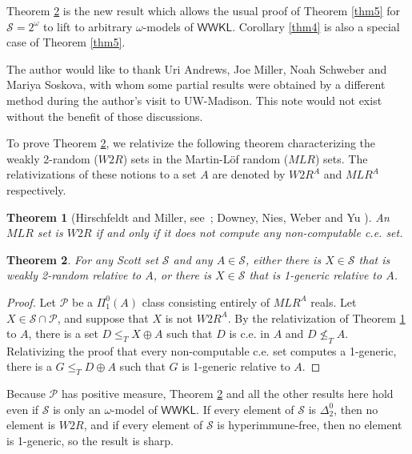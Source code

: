 \documentclass{amsart}
\newtheorem{thm}{Theorem}
\newcommand{\cS}{\mathcal S}
\newcommand{\WWKL}{\mathsf{WWKL}}
\begin{document}
Theorem \ref{thm3} is the new result which allows the usual proof 
of Theorem \ref{thm5} for $\cS = 2^\omega$ to lift to arbitrary 
$\omega$-models of $\WWKL$.
Corollary \ref{thm4} is also a
special case of Theorem \ref{thm5}.  


The author would like to thank Uri Andrews, Joe Miller, Noah Schweber
and Mariya Soskova, with whom some partial results
were obtained by a different method
during the author's visit to
UW-Madison.  This note would not exist without the benefit 
of those discussions.

To prove Theorem \ref{thm3}, we
relativize the following theorem characterizing the 
weakly 2-random ($W2R$) sets in the Martin-L\"of random ($MLR$) sets. 
The relativizations of these notions to a set $A$ are denoted by
$W2R^A$ and $MLR^A$ respectively.

\begin{thm}[Hirschfeldt and Miller, \mbox{see \cite[Thm 5.3.16]{niesbook}}; Downey, Nies, Weber and Yu \cite{dnwy}]\label{hm}
  An $MLR$ set is $W2R$ if and only if it does not compute any
  non-computable c.e. set.
\end{thm}

\begin{thm}\label{thm3}
  For any Scott set $\cS$ and any $A \in \cS$, either there is $X \in \cS$
  that is weakly 2-random relative to $A$, or there is $X \in \cS$ that
  is 1-generic relative to $A$.
\end{thm}
\begin{proof}
  Let $\mathcal P$ be a $\Pi^0_1(A)$ class consisting entirely of $MLR^A$ reals.
  Let $X \in \cS \cap \mathcal P$, and suppose that $X$ is not $W2R^A$.  By the
  relativization of Theorem \ref{hm} to $A$, there is a set $D\leq_T X\oplus A$
  such that $D$ is c.e. in $A$ and $D \not\leq_T A$.  
Relativizing the proof that every 
non-computable c.e. set computes a 1-generic, 
there is a $G \leq_T D \oplus A$ such that $G$ is 1-generic
  relative to $A$.
\end{proof}
Because $\mathcal P$ has positive measure, Theorem \ref{thm3} 
and all the other results here hold even if
$\cS$ is only an $\omega$-model of $\WWKL$.
If every element of $\cS$ is $\Delta^0_2$, then no element is $W2R$,
and if every element of $\cS$ is hyperimmune-free, then no element is
1-generic, so the result is sharp.
\end{document}
